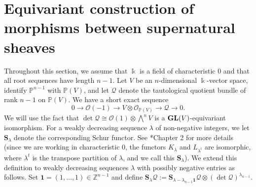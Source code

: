 \documentclass[12pt]{amsart}
\theoremstyle{definition}
\newcommand{\cO}{{\mathcal O}}
\newcommand{\PP}{\mathbb{P}}
\newcommand{\cQ}{\mathcal{Q}}
\newcommand{\Sc}{\mathbf{S}}
\newcommand{\GL}{{\bf GL}}
\begin{document}
\section{Equivariant construction of morphisms between supernatural sheaves}%
\label{sec:equiv:root}

Throughout this section, we assume that $\Bbbk$ is a field of
characteristic 0 and that all root sequences have length $n-1$.  Let $V$ be
an $n$-dimensional $\Bbbk$-vector space, identify $\PP^{n-1}$ with
$\PP(V)$, and let $\cQ$ denote the tautological quotient bundle of
rank $n-1$ on $\PP(V)$.  We have a short exact sequence
\[
0 \to \cO(-1) \to V \otimes \cO_{\PP(V)} \to \cQ \to 0.
\]
We will use the fact that $\det \cQ \cong \cO(1) \otimes \bigwedge^n
V$ is a $\GL(V)$-equivariant isomorphism. For a weakly decreasing
sequence $\lambda$ of non-negative integers, we let $\Sc_\lambda$
denote the corresponding Schur functor. See \cite{weyman}*{Chapter 2}
for more details (since we are working in characteristic 0, the
functors $K_\lambda$ and $L_{\lambda^t}$ are isomorphic, where
$\lambda^t$ is the transpose partition of $\lambda$, and we call this
$\Sc_\lambda$). We extend this definition to weakly decreasing
sequences $\lambda$ with possibly negative entries as follows. Set
$\mathbf{1}=(1,\dots, 1)\in \mathbb Z^{n-1}$ and define
$\Sc_{\lambda}\cQ:=\Sc_{\lambda - \lambda_{n-1}\mathbf{1}}\cQ \otimes
(\det \cQ)^{\lambda_{n-1}}$.
\end{document}
